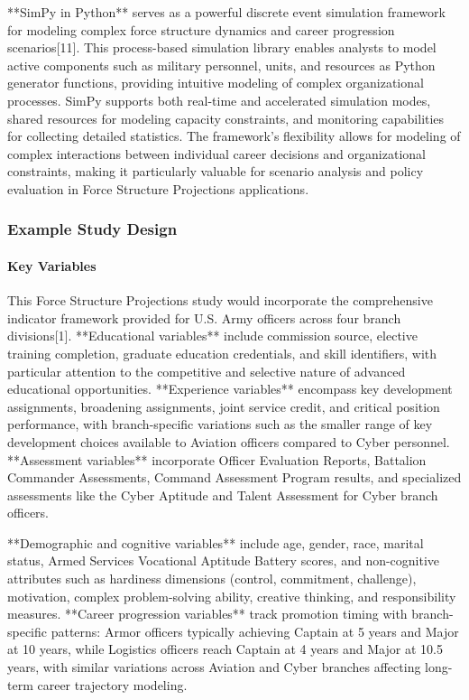 \documentclass[main.tex]{subfiles}
\begin{document}
**SimPy in Python** serves as a powerful discrete event simulation framework for modeling complex force structure dynamics and career progression scenarios[11]. This process-based simulation library enables analysts to model active components such as military personnel, units, and resources as Python generator functions, providing intuitive modeling of complex organizational processes. SimPy supports both real-time and accelerated simulation modes, shared resources for modeling capacity constraints, and monitoring capabilities for collecting detailed statistics. The framework's flexibility allows for modeling of complex interactions between individual career decisions and organizational constraints, making it particularly valuable for scenario analysis and policy evaluation in Force Structure Projections applications.

\subsubsection{Example Study Design}

\paragraph{Key Variables}

This Force Structure Projections study would incorporate the comprehensive indicator framework provided for U.S. Army officers across four branch divisions[1]. **Educational variables** include commission source, elective training completion, graduate education credentials, and skill identifiers, with particular attention to the competitive and selective nature of advanced educational opportunities. **Experience variables** encompass key development assignments, broadening assignments, joint service credit, and critical position performance, with branch-specific variations such as the smaller range of key development choices available to Aviation officers compared to Cyber personnel. **Assessment variables** incorporate Officer Evaluation Reports, Battalion Commander Assessments, Command Assessment Program results, and specialized assessments like the Cyber Aptitude and Talent Assessment for Cyber branch officers.

**Demographic and cognitive variables** include age, gender, race, marital status, Armed Services Vocational Aptitude Battery scores, and non-cognitive attributes such as hardiness dimensions (control, commitment, challenge), motivation, complex problem-solving ability, creative thinking, and responsibility measures. **Career progression variables** track promotion timing with branch-specific patterns: Armor officers typically achieving Captain at 5 years and Major at 10 years, while Logistics officers reach Captain at 4 years and Major at 10.5 years, with similar variations across Aviation and Cyber branches affecting long-term career trajectory modeling.
\end{document}
